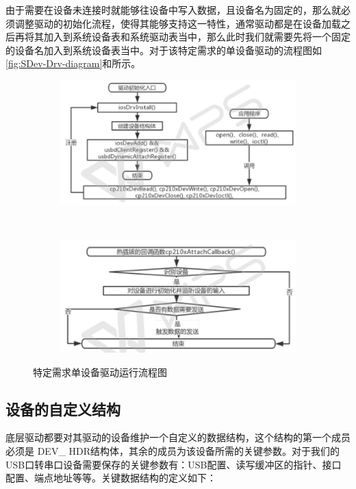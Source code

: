	由于需要在设备未连接时就能够往设备中写入数据，且设备名为固定的，那么就必须调整驱动的初始化流程，使得其能够支持这一特性，通常驱动都是在设备加载之后再将其加入到系统设备表和系统驱动表当中，那么此时我们就需要先将一个固定的设备名加入到系统设备表当中。对于该特定需求的单设备驱动的流程图如\autoref{fig:SDev-Drv-diagram}和所示。
\begin{figure}[h]
\centering
  \begin{subfigure}[b]{1.0\textwidth}
  \includegraphics[width=\textwidth]{./graphics/SDev-Drv-Diagram-a.pdf}
  \caption{}\label{fig:SDevice-Driver-diagram-a}
  \end{subfigure}
  ~
  \begin{subfigure}[b]{1.0\textwidth}
  \includegraphics[width=\textwidth]{./graphics/SDev-Drv-Diagram-b.pdf}
  \caption{}\label{fig:SDevice-Driver-diagram-b}
  \end{subfigure}
\caption{特定需求单设备驱动运行流程图}\label{fig:SDev-Drv-diagram}
\end{figure}




\subsection{设备的自定义结构}
	底层驱动都要对其驱动的设备维护一个自定义的数据结构，这个结构的第一个成员必须是
	DEV\_ HDR结构体，其余的成员为该设备所需的关键参数。对于我们的USB口转串口设备需要保存的关键参数有：USB配置、读写缓冲区的指针、接口配置、端点地址等等。关键数据结构的定义如下： 
	
